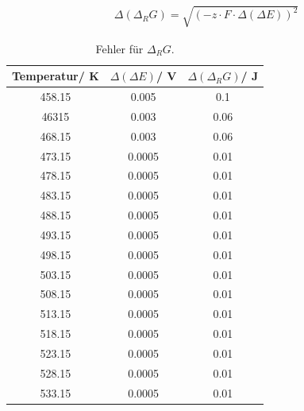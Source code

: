 \documentclass[12pt,a4paper,titlepage,headinclude,bibtotoc]{scrartcl}
\begin{document}
\begin{align}
\Delta(\Delta_R G)= \sqrt{(-z\cdot F \cdot \Delta(\Delta E))^2}
\end{align}
\begin{table}[h]
\centering
\caption{Fehler für $\Delta_R G$.}
\begin{tabular}{c|c|c}
Temperatur/ K & $\Delta(\Delta E)$/ V & $\Delta(\Delta_R G)$/ J \\
\hline
458.15 &  0.005 &  0.1  \\
46315 & 0.003   & 0.06 \\
468.15 & 0.003  & 0.06 \\
473.15 & 0.0005& 0.01 \\
478.15 & 0.0005& 0.01 \\
483.15 & 0.0005& 0.01 \\
488.15 & 0.0005& 0.01 \\
493.15 & 0.0005& 0.01 \\
498.15 & 0.0005& 0.01 \\
503.15 & 0.0005& 0.01 \\
508.15 & 0.0005& 0.01 \\
513.15 & 0.0005& 0.01 \\
518.15 & 0.0005& 0.01 \\
523.15 & 0.0005& 0.01 \\
528.15 & 0.0005& 0.01 \\
533.15 & 0.0005& 0.01 \\
\end{tabular}
\end{table}
\FloatBarrier
\end{document}
